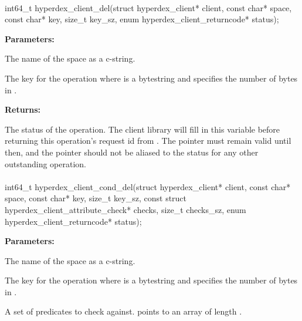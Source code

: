 \paragraph{}
\label{api:c:del}
\begin{ccode}
int64_t hyperdex_client_del(struct hyperdex_client* client,
                const char* space,
                const char* key, size_t key_sz,
                enum hyperdex_client_returncode* status);
\end{ccode}
\funcdesc 

\noindent\textbf{Parameters:}
\begin{description}[labelindent=\widthof{{\code{key}, \code{key\_sz}}},leftmargin=*,noitemsep,nolistsep,align=right]
\item[\code{space}] The name of the space as a c-string.
\item[\code{key}, \code{key\_sz}] The key for the operation where  is a bytestring and  specifies the number of bytes in .
\end{description}

\noindent\textbf{Returns:}
\begin{description}[labelindent=\widthof{{\code{status}}},leftmargin=*,noitemsep,nolistsep,align=right]
\item[\code{status}] The status of the operation.  The client library will fill in this variable before returning this operation's request id from .  The pointer must remain valid until then, and the pointer should not be aliased to the status for any other outstanding operation.
\end{description}

\paragraph{}
\label{api:c:cond_del}
\begin{ccode}
int64_t hyperdex_client_cond_del(struct hyperdex_client* client,
                const char* space,
                const char* key, size_t key_sz,
                const struct hyperdex_client_attribute_check* checks, size_t checks_sz,
                enum hyperdex_client_returncode* status);
\end{ccode}
\funcdesc 

\noindent\textbf{Parameters:}
\begin{description}[labelindent=\widthof{{\code{checks}, \code{checks\_sz}}},leftmargin=*,noitemsep,nolistsep,align=right]
\item[\code{space}] The name of the space as a c-string.
\item[\code{key}, \code{key\_sz}] The key for the operation where  is a bytestring and  specifies the number of bytes in .
\item[\code{checks}, \code{checks\_sz}] A set of predicates to check against.   points to an array of length .
\end{description}

